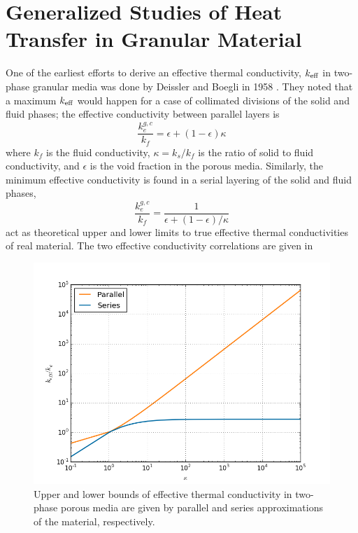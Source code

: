 \section{Generalized Studies of Heat Transfer in Granular Material}
One of the earliest efforts to derive an effective thermal conductivity, $k_\text{eff}$ in two-phase granular media was done by Deissler and Boegli in 1958 \cite{Deissler1958}. They noted that a maximum $k_\text{eff}$ would happen for a case of collimated divisions of the solid and fluid phases; the effective conductivity between parallel layers is
\begin{equation}\label{eq:keff-parallel}
	\frac{k_e^{g,c}}{k_f} = \epsilon + (1-\epsilon)\kappa
\end{equation}
where $k_f$ is the fluid conductivity, $\kappa = k_s/k_f$ is the ratio of solid to fluid conductivity, and $\epsilon$ is the void fraction in the porous media. Similarly, the minimum effective conductivity is found in a serial layering of the solid and fluid phases,
\begin{equation}\label{eq:keff-series}
	\frac{k_e^{g,c}}{k_f} = \frac{1}{\epsilon + (1-\epsilon)/\kappa}
\end{equation}
 act as theoretical upper and lower limits to true effective thermal conductivities of real material. The two effective conductivity correlations are given in 

\begin{figure}[!h]
    \centering
    \includegraphics[width=\singleimagewidth]{figures/keff-kappa-series-parallel}
    \caption{Upper and lower bounds of effective thermal conductivity in two-phase porous media are given by parallel and series approximations of the material, respectively.}
    \label{fig:kappa-series-parallel}
\end{figure}

